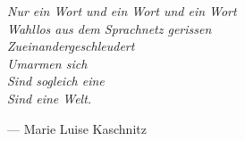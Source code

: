 \cleardoublepage\thispagestyle{empty}
\vspace*{\fill}    
\begin{raggedright}\itshape
Nur ein Wort und ein Wort und ein Wort\\
Wahllos aus dem Sprachnetz gerissen\\
Zueinandergeschleudert\\
Umarmen sich\\
Sind sogleich eine\\
Sind eine Welt.\\
\end{raggedright}
\hbox{}\hfill--- Marie Luise Kaschnitz
\vspace*{\fill}
\cleardoublepage
